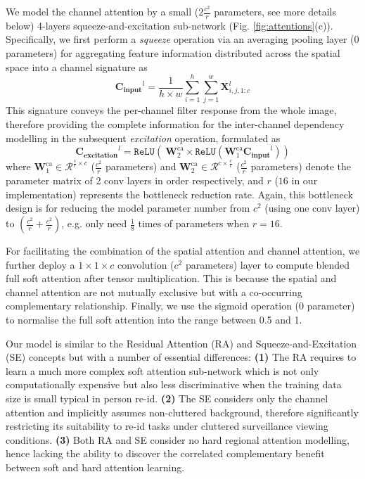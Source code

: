 \documentclass[10pt,twocolumn,letterpaper]{article}
\begin{document}
\vspace{0.01cm}
We model the channel attention by a small 
($2\frac{c^2}{r}$ parameters, see more details below) 4-layers
squeeze-and-excitation sub-network (Fig. \ref{fig:attentions}(c)).
Specifically, we first perform a {\em squeeze} operation 
via an averaging pooling layer (0 parameters) for 
aggregating feature information distributed across the spatial space into
a channel signature as 
\begin{equation}
\bm{{C}_\text{input}}^{l} = \frac{1}{h \times w} \sum_{i=1}^{h}  \sum_{j=1}^{w} \bm{X}^{l}_{i,j,1:c}
\label{eq:squeeze}
\end{equation}
This signature conveys the per-channel filter response from the whole image,
therefore providing the complete information for the inter-channel dependency modelling
in the subsequent {\em excitation} operation, formulated as
\begin{equation}
\bm{{C}_\text{excitation}}^{l} =\texttt{ReLU}(\ \bm{W}_2^\text{ca} \times \texttt{ReLU}(\bm{W}_1^\text{ca} \bm{{C}_\text{input}}^{l}))
\end{equation}
where $\bm{W}_1^\text{ca} \in \mathcal{R}^{\frac{c}{r} \times c}$ 
($\frac{c^2}{r}$ parameters) and 
$\bm{W}_2^\text{ca} \in \mathcal{R}^{c \times \frac{c}{r}}$ 
($\frac{c^2}{r}$ parameters)
denote 
the parameter matrix of 2 conv layers in order respectively,
and $r$ ($16$ in our implementation) represents the bottleneck reduction rate.
Again, this bottleneck design is for reducing the model parameter
number from $c^2$ (using one conv layer) to $(\frac{c^2}{r}\!+\!\frac{c^2}{r})$,
e.g. only need $\frac{1}{8}$ times of parameters when $r=16$.


For facilitating the combination of the spatial attention and channel attention,
we further deploy  a $1\!\times \!1\!\times c$ convolution ($c^2$ parameters) layer to compute blended full soft attention after tensor multiplication. This is because the spatial and channel attention are not mutually exclusive but with a co-occurring complementary relationship. Finally, we use the sigmoid operation (0 parameter) to normalise the full soft attention into the range between 0.5 and 1.

\vspace{0.01cm}
Our model is similar to 
the Residual Attention (RA) \cite{wang2017residual}
and Squeeze-and-Excitation (SE)  \cite{hu2017squeeze} concepts
but with a number of essential differences:
{\bf (1)} The RA requires to learn a much more complex soft attention sub-network which is 
not only computationally expensive but also less discriminative when
the training data size is small typical in person re-id.
{\bf (2)} The SE considers only the channel attention and implicitly
assumes non-cluttered background, therefore significantly restricting
its suitability to re-id tasks under
cluttered surveillance viewing conditions.
{\bf (3)} Both RA and SE consider no hard regional attention modelling, 
hence lacking the ability to discover the correlated complementary benefit
between soft and hard attention learning.
\end{document}

